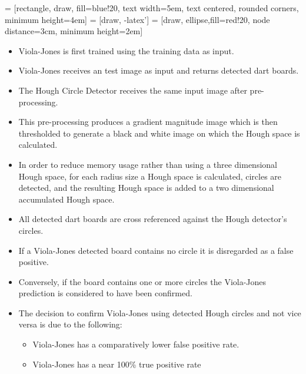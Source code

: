 \documentclass[conference]{IEEEtran}
\begin{document}
 = [rectangle, draw, fill=blue!20, text width=5em, text centered, rounded corners, minimum height=4em]
 = [draw, -latex']
 = [draw, ellipse,fill=red!20, node distance=3cm,
minimum height=2em]


\begin{itemize}
	\item Viola-Jones is first trained using the training data as input.
	\item Viola-Jones receives an test image as input and returns detected dart boards.
	\item The Hough Circle Detector receives the same input image after pre-processing.
	\item This pre-processing produces a gradient magnitude image which is then thresholded to generate a black and white image on which the Hough space is calculated.
	\item In order to reduce memory usage rather than using a three dimensional Hough space, for each radius size a Hough space is calculated, circles are detected, and the resulting Hough space is added to a two dimensional accumulated Hough space. 
	\item All detected dart boards are cross referenced against the Hough detector's circles.
	\item If a Viola-Jones detected board contains no circle it is disregarded as a false positive.
	\item Conversely, if the board contains one or more circles the Viola-Jones prediction is considered to have been confirmed.
	\item The decision to confirm Viola-Jones using detected Hough circles and not vice versa is due to the following: 
	\begin{itemize}
		\item Viola-Jones has a comparatively lower false positive rate.
		\item Viola-Jones has a near 100\% true positive rate
	\end{itemize}
\end{itemize}
\end{document}
